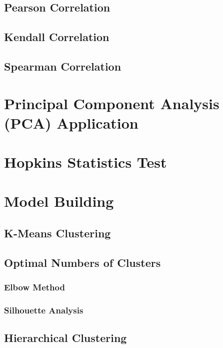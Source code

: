 \documentclass{swfuthesise}
\begin{document}
\subsection{Pearson Correlation}
\lipsum[31]

\subsection{Kendall Correlation}
\lipsum[32]

\subsection{Spearman Correlation}
\lipsum[33]

\section{Principal Component Analysis (PCA) Application}
\lipsum[34]

\section{Hopkins Statistics Test}
\lipsum[35]

\section{Model Building}
\lipsum[36]

\subsection{K-Means Clustering}
\lipsum[37]

\subsection{Optimal Numbers of Clusters}
\lipsum[38]

\subsubsection{Elbow Method}
\lipsum[39]

\subsubsection{Silhouette Analysis}
\lipsum[40]

\subsection{Hierarchical Clustering}
\lipsum[41]
\end{document}
